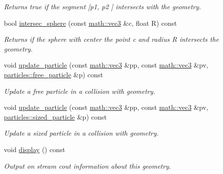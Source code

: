 \begin{DoxyCompactItemize}
\begin{DoxyCompactList}\small\item\em Returns true if the segment \mbox{[}{\itshape p1}, {\itshape p2} \mbox{]} intersects with the geometry. \end{DoxyCompactList}\item 
bool \hyperlink{classphysim_1_1geometric_1_1rectangle_a39a293ca40cfbde7a2ef8c1ab487833d}{intersec\+\_\+sphere} (const \hyperlink{structphysim_1_1math_1_1vec3}{math\+::vec3} \&c, float R) const
\begin{DoxyCompactList}\small\item\em Returns if the sphere with center the point {\itshape c} and radius {\itshape R} intersects the geometry. \end{DoxyCompactList}\item 
void \hyperlink{classphysim_1_1geometric_1_1rectangle_a38e4eaa8bff24511cd3a9d94cd04e3dd}{update\+\_\+particle} (const \hyperlink{structphysim_1_1math_1_1vec3}{math\+::vec3} \&pp, const \hyperlink{structphysim_1_1math_1_1vec3}{math\+::vec3} \&pv, \hyperlink{classphysim_1_1particles_1_1free__particle}{particles\+::free\+\_\+particle} \&p) const
\begin{DoxyCompactList}\small\item\em Update a free particle in a collision with geometry. \end{DoxyCompactList}\item 
void \hyperlink{classphysim_1_1geometric_1_1rectangle_a61fead9b22595c9d9be8dc3867e26717}{update\+\_\+particle} (const \hyperlink{structphysim_1_1math_1_1vec3}{math\+::vec3} \&pp, const \hyperlink{structphysim_1_1math_1_1vec3}{math\+::vec3} \&pv, \hyperlink{classphysim_1_1particles_1_1sized__particle}{particles\+::sized\+\_\+particle} \&p) const
\begin{DoxyCompactList}\small\item\em Update a sized particle in a collision with geometry. \end{DoxyCompactList}\item 
\mbox{\label{classphysim_1_1geometric_1_1rectangle_a89511cf054316c8f0b6d0adbbf9b511e}} 
void \hyperlink{classphysim_1_1geometric_1_1rectangle_a89511cf054316c8f0b6d0adbbf9b511e}{display} () const
\begin{DoxyCompactList}\small\item\em Output on stream {\itshape cout} information about this geometry. \end{DoxyCompactList}\end{DoxyCompactItemize}
